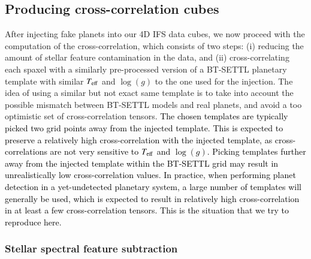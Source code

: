 \documentclass{aa}
\newcommand{\newchange}[1]{\textcolor{black}{#1}}
\begin{document}
\subsection{Producing cross-correlation cubes}\label{sec:specpreproc}

After injecting fake planets into our 4D IFS data cubes, we now proceed with the computation of the cross-correlation, which consists of two steps: (i) reducing the amount of stellar feature contamination in the data, and (ii) cross-correlating each spaxel with a similarly pre-processed version of a BT-SETTL planetary template with similar $T_{\rm eff}$ and $\log(g)$ to the one used for the injection.
The idea of using a similar but not exact same template is to take into account the possible mismatch between BT-SETTL models and real planets, and avoid a too optimistic set of cross-correlation tensors. 
\newchange{The chosen templates are typically picked two grid points away from the injected template. This is expected to preserve a relatively high cross-correlation with the injected template, as cross-correlations are not very sensitive to $T_{\rm eff}$ and $\log(g)$. 
Picking templates further away from the injected template within the BT-SETTL grid may result in unrealistically low cross-correlation values. In practice, when performing planet detection in a yet-undetected planetary system, a large number of templates will generally be used, which is expected to result in relatively high cross-correlation in at least a few cross-correlation tensors. This is the situation that we try to reproduce here.}


\subsubsection{Stellar spectral feature subtraction}
\end{document}
